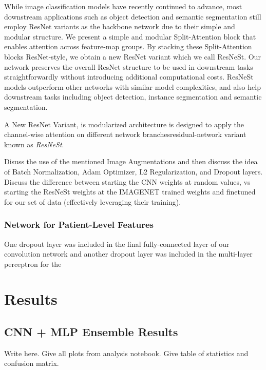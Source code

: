 \documentclass [MAS] {uclathes}
\begin{document}
While image classification models have recently continued to advance, most downstream applications such as object detection and semantic segmentation still employ ResNet variants as the backbone network due to their simple and modular structure. We present a simple and modular Split-Attention block that enables attention across feature-map groups. By stacking these Split-Attention blocks ResNet-style, we obtain a new ResNet variant which we call ResNeSt. Our network preserves the overall ResNet structure to be used in downstream tasks straightforwardly without introducing additional computational costs. ResNeSt models outperform other networks with similar model complexities, and also help downstream tasks including object detection, instance segmentation and semantic segmentation.

A New ResNet Variant, is modularized architecture is designed to apply the channel-wise attention on different network branchesresidual-network variant known as \textit{ResNeSt}.

Disuss the use of the mentioned Image Augmentations and then discuss the idea of Batch Normalization, Adam Optimizer, L2 Regularization, and Dropout layers. Discuss the difference between starting the CNN weights at random values, vs starting the ResNeSt weights at the IMAGENET trained weights and finetuned for our set of data (effectively leveraging their training).

\subsection{Network for Patient-Level Features}


One dropout layer was included in the final fully-connected layer of our convolution network and another dropout layer was included in the multi-layer perceptron for the 


\chapter{Results}


\section{CNN + MLP Ensemble Results}

Write here. Give all plots from analysis notebook. Give table of statistics and confusion matrix.
\end{document}
